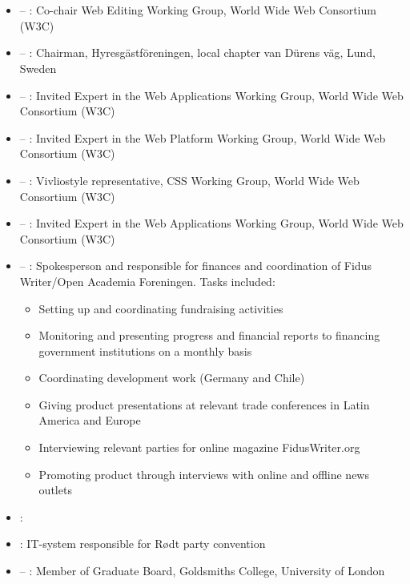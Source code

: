 \section*{\organizationexperience}

\begin{itemize}
\item {} – : Co-chair Web Editing Working Group, World Wide Web Consortium (W3C)
\item {} – : Chairman, Hyresgästföreningen, local chapter van Dürens väg, Lund, Sweden
\item {} – : Invited Expert in the Web Applications Working Group, World Wide Web Consortium (W3C)
\item {} – : Invited Expert in the Web Platform Working Group, World Wide Web Consortium (W3C)
\item {} – : Vivliostyle representative, CSS Working Group, World Wide Web Consortium (W3C)
\item {} –  : Invited Expert in the Web Applications Working Group, World Wide Web Consortium (W3C)
\item {} – : Spokesperson and responsible for finances and coordination of Fidus Writer/Open Academia Foreningen. Tasks included:
\begin{itemize}
\item Setting up and coordinating fundraising activities
\item Monitoring and presenting progress and financial reports to financing government institutions on a monthly basis
\item Coordinating development work (Germany and Chile)
\item Giving product presentations at relevant trade conferences in Latin America and Europe
\item Interviewing relevant parties for online magazine FidusWriter.org
\item Promoting product through interviews with online and offline news outlets
\end{itemize}
\item {}: 
\item {}: IT-system responsible for Rødt party convention
\item {} –  : Member of Graduate Board, Goldsmiths College, University of London

\end{itemize}
